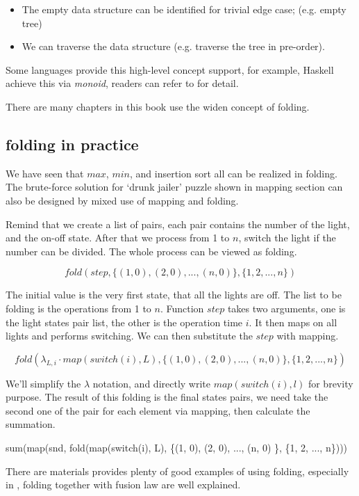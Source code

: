 \documentclass[UTF8]{article}
\begin{document}
\begin{itemize}
\item The empty data structure can be identified for trivial edge case; (e.g. empty tree)
\item We can traverse the data structure (e.g. traverse the tree in pre-order).
\end{itemize}

Some languages provide this high-level concept support, for example, Haskell achieve this via
{\em monoid}, readers can refer to \cite{learn-haskell} for detail.

There are many chapters in this book use the widen concept of folding.

\subsection{folding in practice}

We have seen that $max$, $min$, and insertion sort all can be realized in folding. The
brute-force solution for `drunk jailer' puzzle shown in mapping section can also be
designed by mixed use of mapping and folding.

Remind that we create a list of pairs, each pair contains the number of the light, and
the on-off state. After that we process from 1 to $n$, switch the light if the number
can be divided. The whole process can be viewed as folding.

\[
fold(step, \{(1, 0), (2, 0), ..., (n, 0) \}, \{1, 2, ..., n\})
\]

The initial value is the very first state, that all the lights are off. The list to be
folding is the operations from 1 to $n$. Function $step$ takes two arguments, one is
the light states pair list, the other is the operation time $i$. It then maps
on all lights and performs switching. We can then substitute the $step$ with mapping.

\[
fold(\lambda_{L, i} \cdot map(switch(i), L), \{(1, 0), (2, 0), ..., (n, 0) \}, \{1, 2, ..., n\})
\]

We'll simplify the $\lambda$ notation, and directly write $map(switch(i), l)$ for brevity purpose.
The result of this folding is the final states pairs, we need take the second one of the pair
for each element via mapping, then calculate the summation.

\be
sum(map(snd, fold(map(switch(i), L), \{(1, 0), (2, 0), ..., (n, 0) \}, \{1, 2, ..., n\})))
\ee

There are materials provides plenty of good examples of using folding, especially in \cite{fp-pearls},
folding together with fusion law are well explained.
\end{document}

